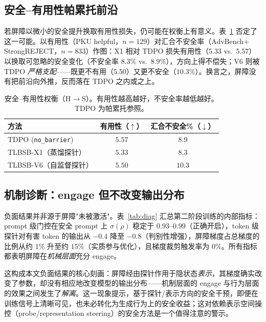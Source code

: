 \documentclass[lettersize,journal]{IEEEtran}
\begin{document}
\subsection{安全--有用性帕累托前沿}\label{exp:pareto}
若屏障以微小的安全提升换取有用性损失，仍可能在权衡上有意义。表~\ref{tab:pareto} 否定了这一可能。以有用性（PKU helpful，$n{=}129$）对汇合不安全率（AdvBench$+$StrongREJECT，$n{=}833$）作图：X1 相对 TDPO 损失有用性（$5.33$ vs.\ $5.57$）以换取可忽略的安全变化（不安全率 $8.3\%$ vs.\ $8.9\%$），方向上得不偿失；V6 则被 TDPO \emph{严格支配}——既更不有用（$5.50$）又更不安全（$10.3\%$）。换言之，屏障没有把前沿向外推，反而落在 TDPO 之内或之上。

\begin{table}[t]
\centering
\caption{安全--有用性权衡（H$\to$S）。有用性越高越好，不安全率越低越好。TDPO 为帕累托参照。}
\label{tab:pareto}
\begin{tabular}{lcc}
\toprule
方法 & 有用性（$\uparrow$） & 汇合不安全\%（$\downarrow$） \\
\midrule
TDPO (\texttt{no\_barrier}) & $5.57$ & $8.9$ \\
TLBSB-X1（蒸馏探针） & $5.33$ & $8.3$ \\
TLBSB-V6（自监督探针） & $5.50$ & $10.3$ \\
\bottomrule
\end{tabular}
\end{table}

\subsection{机制诊断：engage 但不改变输出分布}\label{exp:diag}
负面结果并非源于屏障"未被激活"。表~\ref{tab:diag} 汇总第二阶段训练的内部指标：prompt 级门控在安全 prompt 上 $\sigma(\rho)$ 稳定于 $0.93$--$0.99$（正确开启），token 级探针对有害 token 的输出从 $-0.4$ 降至 $-0.8$（判别性增强），屏障梯度占总梯度的比例从约 $1\%$ 升至约 $15\%$（实质参与优化），且梯度裁剪触发率为 $0\%$。所有指标都表明屏障在\emph{机械层面}充分 engage。

这构成本文负面结果的核心刻画：屏障经由探针作用于隐状态\emph{表示}，其梯度确实改变了参数，却没有相应地改变模型的输出分布——机制层面的 engage 与行为层面的效果之间发生了\emph{解离}。这一现象提示，基于探针/表示方向的安全干预，即便在训练信号上清晰可见，也未必转化为生成行为上的安全收益；这对依赖表示空间操控（probe/representation steering）的安全方法是一个值得注意的警示。
\end{document}
